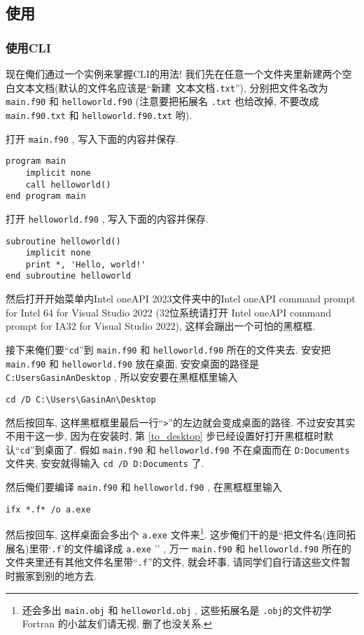 \subsection{使用}\label{use_ifx}

\subsubsection{使用CLI}

现在俺们通过一个实例来掌握CLI的用法! 我们先在任意一个文件夹里新建两个空白文本文档(默认的文件名应该是``\textsf{新建}\texttt{\ }\textsf{文本文档}\texttt{.txt}''), 分别把文件名改为 \texttt{main.f90} 和 \texttt{helloworld.f90} (注意要把拓展名 \texttt{.txt} 也给改掉, 不要改成 \texttt{main.f90.txt} 和 \texttt{helloworld.f90.txt} 哟).

打开 \texttt{main.f90} , 写入下面的内容并保存.
\begin{lstlisting}
program main
    implicit none
    call helloworld()
end program main
\end{lstlisting}

打开 \texttt{helloworld.f90} , 写入下面的内容并保存.
\begin{lstlisting}
subroutine helloworld()
    implicit none
    print *, 'Hello, world!'
end subroutine helloworld
\end{lstlisting}

然后打开开始菜单内Intel oneAPI 2023文件夹中的Intel oneAPI command prompt for Intel 64 for Visual Studio 2022 (32位系统请打开 Intel oneAPI command prompt for IA32 for Visual Studio 2022), 这样会蹦出一个可怕的黑框框.

接下来俺们要``\texttt{cd}''到 \texttt{main.f90} 和 \texttt{helloworld.f90} 所在的文件夹去. 安安把 \texttt{main.f90} 和 \texttt{helloworld.f90} 放在桌面, 安安桌面的路径是\texttt{C:\bs{}Users\bs{}GasinAn\bs{}Desktop} , 所以安安要在黑框框里输入
\begin{verbatim}
cd /D C:\Users\GasinAn\Desktop
\end{verbatim}
然后按回车, 这样黑框框里最后一行``\texttt{>}''的左边就会变成桌面的路径. 不过安安其实不用干这一步, 因为在安装时, 第 \ref{to_desktop} 步已经设置好打开黑框框时默认``\texttt{cd}''到桌面了. 假如 \texttt{main.f90} 和 \texttt{helloworld.f90} 不在桌面而在 \texttt{D:\bs{}Documents} 文件夹, 安安就得输入 \texttt{cd /D D:\bs{}Documents} 了.

然后俺们要编译 \texttt{main.f90} 和 \texttt{helloworld.f90} , 在黑框框里输入
\begin{verbatim}
ifx *.f* /o a.exe
\end{verbatim}
然后按回车, 这样桌面会多出个 \texttt{a.exe} 文件来\footnote{还会多出 \texttt{main.obj} 和 \texttt{helloworld.obj} , 这些拓展名是 \texttt{.obj}的文件初学 Fortran 的小盆友们请无视, 删了也没关系.}. 这步俺们干的是``把文件名(连同拓展名)里带`\texttt{.f}'的文件编译成 \texttt{a.exe} '' , 万一 \texttt{main.f90} 和 \texttt{helloworld.f90} 所在的文件夹里还有其他文件名里带``\texttt{.f}''的文件, 就会坏事, 请同学们自行请这些文件暂时搬家到别的地方去.

